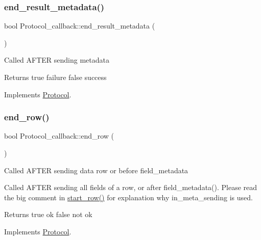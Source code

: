 \subsubsection{\texorpdfstring{end\+\_\+result\+\_\+metadata()}{end\_result\_metadata()}}
{\footnotesize\ttfamily bool Protocol\+\_\+callback\+::end\+\_\+result\+\_\+metadata (\begin{DoxyParamCaption}{ }\end{DoxyParamCaption})\hspace{0.3cm}{\ttfamily [virtual]}}

Called A\+F\+T\+ER sending metadata

\begin{DoxyReturn}{Returns}
true failure false success 
\end{DoxyReturn}


Implements \mbox{\hyperlink{classProtocol_a48bb540f0317bf418c129f441f2e82b9}{Protocol}}.

\mbox{\label{classProtocol__callback_a192b3291bd670f6ae16118a9ae58c378}} 
\subsubsection{\texorpdfstring{end\+\_\+row()}{end\_row()}}
{\footnotesize\ttfamily bool Protocol\+\_\+callback\+::end\+\_\+row (\begin{DoxyParamCaption}{ }\end{DoxyParamCaption})\hspace{0.3cm}{\ttfamily [virtual]}}

Called A\+F\+T\+ER sending data row or before field\+\_\+metadata

Called A\+F\+T\+ER sending all fields of a row, or after field\+\_\+metadata(). Please read the big comment in \mbox{\hyperlink{classProtocol__callback_a951efbe2b108b81630d827830f89b3d7}{start\+\_\+row()}} for explanation why in\+\_\+meta\+\_\+sending is used.

\begin{DoxyReturn}{Returns}
true ok false not ok 
\end{DoxyReturn}


Implements \mbox{\hyperlink{classProtocol}{Protocol}}.

\mbox{\label{classProtocol__callback_af675b178de4d07c875e50db63ce751e4}} 
